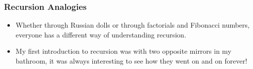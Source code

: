 \message{ !name(recursion.tex)}\documentclass[fleqn, t]{beamer}
\begin{document}
\begin{frame}
  \frametitle{Recursion Analogies}
  \begin{itemize}[<+->]
  \item Whether through Russian dolls or through factorials and Fibonacci
    numbers, everyone has a different way of understanding recursion. 
  \item My first introduction to recursion was with two opposite mirrors in my
    bathroom, it was always interesting to see how they went on and on forever!
  \end{itemize}
  \begin{figure}
  \end{figure}
\end{frame}
\end{document}
